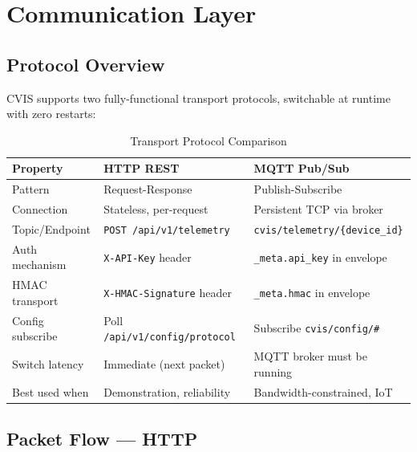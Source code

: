 \documentclass[12pt,a4paper]{report}
\begin{document}
\chapter{Communication Layer}

\section{Protocol Overview}

CVIS supports two fully-functional transport protocols, switchable at runtime with zero restarts:

\begin{table}[H]
\centering
\caption{Transport Protocol Comparison}
\label{tab:protocols}
\begin{tabularx}{\textwidth}{L{2.8cm} X X}
\toprule
\textbf{Property} & \textbf{HTTP REST} & \textbf{MQTT Pub/Sub} \\
\midrule
Pattern & Request-Response & Publish-Subscribe \\
Connection & Stateless, per-request & Persistent TCP via broker \\
Topic/Endpoint & \texttt{POST /api/v1/telemetry} & \texttt{cvis/telemetry/\{device\_id\}} \\
Auth mechanism & \texttt{X-API-Key} header & \texttt{\_meta.api\_key} in envelope \\
HMAC transport & \texttt{X-HMAC-Signature} header & \texttt{\_meta.hmac} in envelope \\
Config subscribe & Poll \texttt{/api/v1/config/protocol} & Subscribe \texttt{cvis/config/\#} \\
Switch latency & Immediate (next packet) & MQTT broker must be running \\
Best used when & Demonstration, reliability & Bandwidth-constrained, IoT \\
\bottomrule
\end{tabularx}
\end{table}

\section{Packet Flow — HTTP}
\end{document}
